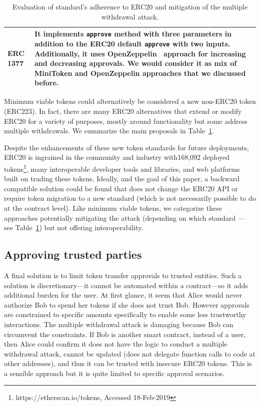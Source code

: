 \begin{table}
\begin{tabular}{|m{1.3cm}|m{15cm}|}
	\hline\centering 
	ERC 1377 \cite{Ref26} & It implements \texttt{approve} method with three parameters in addition to the ERC20 default \texttt{approve} with two inputs. Additionally, it uses OpenZeppelin~\cite{Ref10} approach for increasing and decreasing approvals. We would consider it as mix of MiniToken and OpenZeppelin approaches that we discussed before.\\
	\hline
\end{tabular}
\newline
\caption{Evaluation of standard's adherence to ERC20 and mitigation of the multiple withdrawal attack.\label{tab:erc}}
\end{table}

Minimum viable tokens could alternatively be considered a new non-ERC20 token (\cf ERC223). In fact, there are many ERC20 alternatives that extend or modify ERC20 for a variety of purposes, mostly around functionality but some address multiple withdrawals. We summarize the main proposals in Table~\ref{tab:erc}. 

Despite the enhancements of these new token standards for future deployments, ERC20 is ingrained in the community and industry with168,092 deployed tokens\footnote{https://etherscan.io/tokens, Accessed 18-Feb-2019}, many interoperable developer tools and libraries, and web platforms built on trading these tokens. Ideally, and the goal of this paper, a backward compatible solution could be found that does not change the ERC20 API or require token migration to a new standard (which is not necessarily possible to do at the contract level). Like minimum viable tokens, we categorize these approaches potentially mitigating the attack (depending on which standard --- see Table~\ref{tab:erc}) but not offering interoperability.


\subsection{Approving trusted parties}

A final solution is to limit token transfer approvals to trusted entities. Such a solution is discretionary---it cannot be automated within a contract---so it adds additional burden for the user. At first glance, it seem that Alice would never authorize Bob to spend her tokens if she does not trust Bob. However approvals are constrained to specific amounts specifically to enable some less trustworthy interactions. The multiple withdrawal attack is damaging because Bob can circumvent the constraints. If Bob is another smart contract, instead of a user, then Alice could confirm it does not have the logic to conduct a multiple withdrawal attack, cannot be updated (\eg does not delegate function calls to code at other addresses), and thus it can be trusted with insecure ERC20 tokens. This is a sensible approach but it is quite limited to specific approval scenarios.
